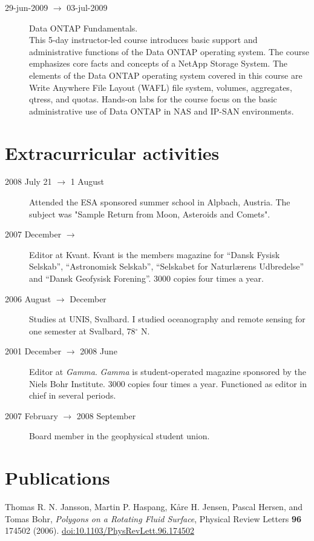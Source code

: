 \documentclass[margin,line,a4paper]{resume05}
\begin{document}
\begin{resume}
\begin{description}
    \item[ 29-jun-2009 $\rightarrow$ 03-jul-2009] Data ONTAP Fundamentals.\\
    This 5-day instructor-led course introduces basic support and
    administrative functions of the Data ONTAP operating system. The course
    emphasizes core facts and concepts of a NetApp Storage System. The elements
    of the Data ONTAP operating system covered in this course are Write
    Anywhere File Layout (WAFL) file system, volumes, aggregates, qtress, and
    quotas. Hands-on labs for the course focus on the basic administrative use
    of Data ONTAP in NAS and IP-SAN environments.
\end{description}


\section{\mysidestyle Extracurricular activities}\vspace{1mm}
    \begin{description}
    \item[2008 July 21 $\rightarrow$ 1 August ] Attended the ESA sponsored 
    summer school in Alpbach, Austria. The subject was "Sample Return from
    Moon, Asteroids and Comets".
    \item[2007 December $\rightarrow$ ] Editor at Kvant.  Kvant is the members
    magazine for ``Dansk Fysisk Selskab'', ``Astronomisk Selskab'', ``Selskabet
    for Naturlærens Udbredelse'' and ``Dansk Geofysisk Forening''. 3000 copies
    four times a year. 
    \item[2006 August $\rightarrow$ December ] Studies at UNIS, Svalbard. I
    studied oceanography and remote sensing for one semester at Svalbard,
    78$^\circ$ N.
    \item[2001 December $\rightarrow$ 2008 June ] Editor at \emph{Gamma}.
    \emph{Gamma} is student-operated magazine sponsored by the Niels Bohr
    Institute. 3000 copies four times a year. Functioned as editor in chief
    in several periods. 
    \item[2007 February $\rightarrow$ 2008 September ] Board member in the
    geophysical student union.
    \end{description}






\section{\mysidestyle Publications}
    Thomas R. N. Jansson, Martin P. Haspang, Kåre H. Jensen, Pascal
    Hersen, and Tomas Bohr, \textit{Polygons on a Rotating Fluid
    Surface}, Physical Review Letters \textbf{96} 174502 (2006).
    \url{doi:10.1103/PhysRevLett.96.174502} 
    

\end{resume}
\end{document}
